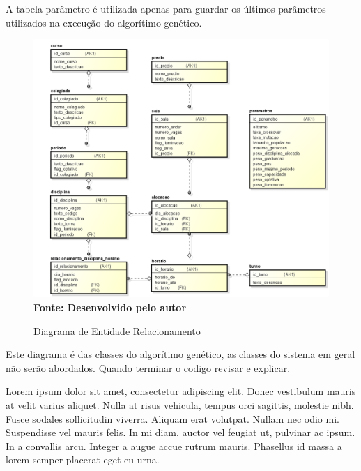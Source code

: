A tabela parâmetro é utilizada apenas para guardar os últimos parâmetros utilizados na execução do algorítimo genético.\par

\begin{figure}[!htb]
\caption[Diagrama de Entidade Relacionamento]{Diagrama de Entidade Relacionamento}
\label{fig:figura2}
\centering
\includegraphics[scale=0.5]{imagens/diagramaEntidadeRelacionamento.png}
\\ \textbf{\footnotesize Fonte: Desenvolvido pelo autor}
\end{figure}


Este diagrama é das classes do algorítimo genético, as classes do sistema em geral não serão abordados. Quando terminar o codigo revisar e explicar.\par
Lorem ipsum dolor sit amet, consectetur adipiscing elit. Donec vestibulum mauris at velit varius aliquet. Nulla at risus vehicula, tempus orci sagittis, molestie nibh. Fusce sodales sollicitudin viverra. Aliquam erat volutpat. Nullam nec odio mi. Suspendisse vel mauris felis. In mi diam, auctor vel feugiat ut, pulvinar ac ipsum. In a convallis arcu. Integer a augue accue rutrum mauris. Phasellus id massa a lorem semper placerat eget eu urna.\par

